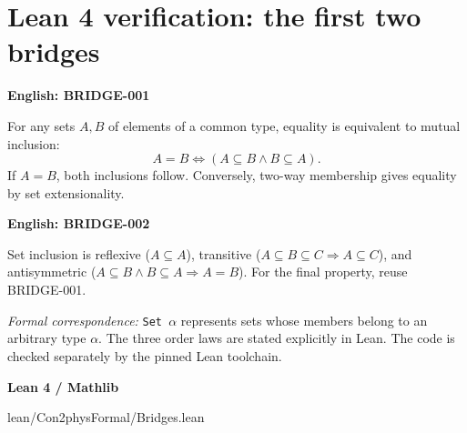 \section{Lean 4 verification: the first two bridges}
\label{sec:lean-bridges-01-02}
\noindent\begin{minipage}[t]{0.44\textwidth}
\textbf{English: BRIDGE-001}

For any sets $A,B$ of elements of a common type, equality is equivalent
to mutual inclusion:
\[A=B\iff(A\subseteq B\land B\subseteq A).\]
If $A=B$, both inclusions follow. Conversely, two-way membership gives
equality by set extensionality.

\medskip\textbf{English: BRIDGE-002}

Set inclusion is reflexive ($A\subseteq A$), transitive
($A\subseteq B\subseteq C\Rightarrow A\subseteq C$), and
antisymmetric ($A\subseteq B\land B\subseteq A\Rightarrow A=B$).
For the final property, reuse BRIDGE-001.

\medskip\textit{Formal correspondence:} \texttt{Set $\alpha$} represents
sets whose members belong to an arbitrary type $\alpha$.
The three order laws are stated explicitly in Lean.
The code is checked separately by the pinned Lean toolchain.
\end{minipage}\hfill
\begin{minipage}[t]{0.53\textwidth}
\textbf{Lean 4 / Mathlib}


{lean/Con2physFormal/Bridges.lean}
\end{minipage}

